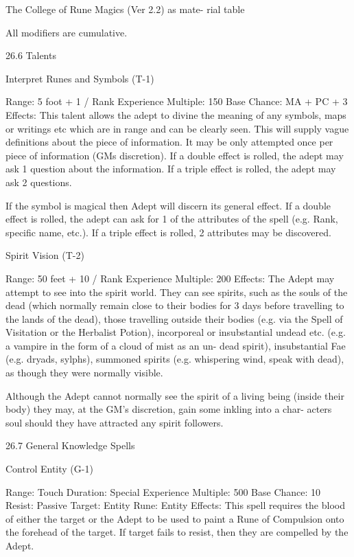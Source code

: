\begin{Chapter}{The College of Rune Magics (Ver 2.2)}
as mate-
rial table 

All modifiers are cumulative. 

26.6 Talents 

Interpret Runes and Symbols (T-1) 

Range: 5 foot + 1 / Rank 
Experience Multiple: 150 
Base Chance: MA + PC + 3%
Effects:  This  talent  allows  the  adept  to  divine  the 
meaning  of  any  symbols,  maps  or  writings  etc 
which  are  in  range  and  can  be  clearly  seen.  This 
will  supply  vague  definitions  about  the  piece  of 
information.  It  may  be  only  attempted  once  per 
piece of information (GMs discretion).  If a double 
effect is rolled, the adept may ask 1 question about 
the information. If a triple effect is rolled, the adept 
may ask 2 questions. 

If the symbol is magical then Adept will discern its 
general effect. If a double effect is rolled, the adept 
can  ask  for  1  of  the  attributes  of  the  spell  (e.g. 
Rank,  specific  name,  etc.).  If  a  triple  effect  is 
rolled, 2 attributes may be discovered. 

Spirit Vision (T-2) 

Range: 50 feet + 10 / Rank 
Experience Multiple: 200 
Effects:  The  Adept  may  attempt  to  see  into  the 
spirit world. They can see spirits, such as the souls 
of  the  dead  (which  normally  remain  close  to  their 
bodies  for  3  days  before  travelling  to  the  lands  of 
the dead), those travelling outside their bodies (e.g. 
via the Spell of Visitation or the Herbalist Potion), 
incorporeal  or  insubstantial  undead  etc.  (e.g.  a 
vampire  in  the  form  of  a  cloud  of  mist  as  an  un-
dead spirit), insubstantial Fae (e.g. dryads, sylphs), 
summoned  spirits  (e.g.  whispering  wind,  speak 
with dead), as though they were normally visible. 

Although the  Adept cannot  normally  see  the  spirit 
of  a  living  being  (inside  their  body)  they  may,  at 
the GM’s discretion, gain some inkling into a char-
acters  soul  should  they  have  attracted  any  spirit 
followers. 

26.7 General Knowledge Spells 

Control Entity (G-1) 

Range: Touch 
Duration: Special 
Experience Multiple: 500 
Base Chance: 10%
Resist: Passive 
Target: Entity  
Rune: Entity 
Effects:  This  spell  requires  the  blood  of  either  the 
target  or  the  Adept  to  be  used  to  paint  a  Rune  of 
Compulsion  onto  the  forehead  of  the  target.  If 
target fails to resist, then they are compelled by the 
Adept. 


\end{Chapter}
